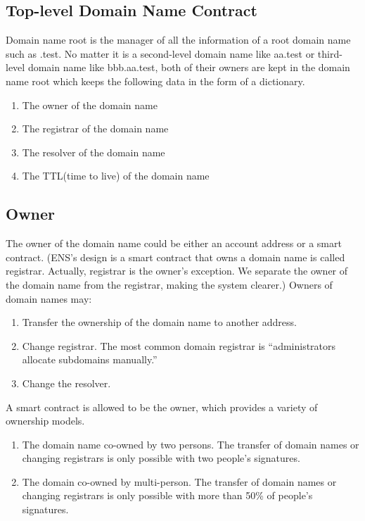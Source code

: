\documentclass[letterpaper,10pt,english]{sphinxmanual}
\begin{document}
\subsection{Top-level Domain Name Contract}
\label{\detokenize{nns_system:top-level-domain-name-contract}}
Domain name root is the manager of all the information of a root domain name such as .test.
No matter it is a second-level domain name like aa.test or third-level domain name like bbb.aa.test,
both of their owners are kept in the domain name root which keeps the following data in the form of a dictionary.
\begin{enumerate}
\item {} 
The owner of the domain name

\item {} 
The registrar of the domain name

\item {} 
The resolver of the domain name

\item {} 
The TTL(time to live) of the domain name

\end{enumerate}


\subsection{Owner}
\label{\detokenize{nns_system:owner}}
The owner of the domain name could be either an account address or a smart contract.
(ENS’s design is a smart contract that owns a domain name is called registrar. Actually, registrar is the owner’s exception.
We separate the owner of the domain name from the registrar, making the system clearer.)
Owners of domain names may:
\begin{enumerate}
\item {} 
Transfer the ownership of the domain name to another address.

\item {} 
Change registrar. The most common domain registrar is “administrators allocate subdomains manually.”

\item {} 
Change the resolver.

\end{enumerate}

A smart contract is allowed to be the owner, which provides a variety of ownership models.
\begin{enumerate}
\item {} 
The domain name co-owned by two persons. The transfer of domain names or changing registrars is only possible with two people’s signatures.

\item {} 
The domain co-owned by multi-person. The transfer of domain names or changing registrars is only possible with more than 50\% of people’s signatures.

\end{enumerate}
\end{document}
